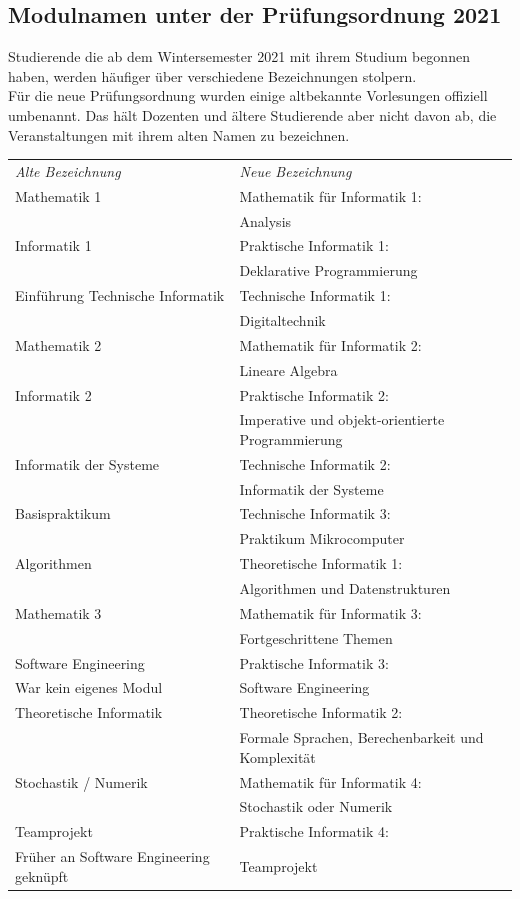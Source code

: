 \subsection*{Modulnamen unter der Prüfungsordnung 2021}
Studierende die ab dem Wintersemester 2021 mit ihrem Studium begonnen haben,
werden häufiger über verschiedene Bezeichnungen stolpern.\\
Für die neue Prüfungsordnung wurden einige altbekannte Vorlesungen offiziell
umbenannt. Das hält Dozenten und ältere Studierende aber nicht davon ab, die
Veranstaltungen mit ihrem alten Namen zu bezeichnen.

\begin{tabular}{ll}
\emph{Alte Bezeichnung}						& \emph{Neue Bezeichnung} \\[.7em]
Mathematik 1											& Mathematik für Informatik 1: \\
																	& Analysis \\[.7em]
Informatik 1										  & Praktische Informatik 1: \\
																	& Deklarative Programmierung \\[.7em]
Einführung Technische Informatik  & Technische Informatik 1: \\
																	& Digitaltechnik \\[.7em]
Mathematik 2											& Mathematik für Informatik 2: \\
																	& Lineare Algebra \\[.7em]
Informatik 2											& Praktische Informatik 2: \\
																	& Imperative und objekt-orientierte Programmierung \\[.7em]
Informatik der Systeme						& Technische Informatik 2: \\
																	& Informatik der Systeme \\[.7em]
Basispraktikum										& Technische Informatik 3: \\
																	&	Praktikum Mikrocomputer \\[.7em]
Algorithmen												& Theoretische Informatik 1: \\
																	& Algorithmen und Datenstrukturen \\[.7em]
Mathematik 3											& Mathematik für Informatik 3: \\
																	& Fortgeschrittene Themen \\[.7em]
Software Engineering							& Praktische Informatik 3: \\
\footnotesize{War kein eigenes Modul}		& Software Engineering \\[.7em]
Theoretische Informatik						& Theoretische Informatik 2: \\
																	& Formale Sprachen, Berechenbarkeit und Komplexität \\[.7em]
Stochastik / Numerik							& Mathematik für Informatik 4: \\
																	& Stochastik oder Numerik \\[.7em]
Teamprojekt												& Praktische Informatik 4: \\
\footnotesize{Früher an Software Engineering geknüpft} & Teamprojekt
\end{tabular}

